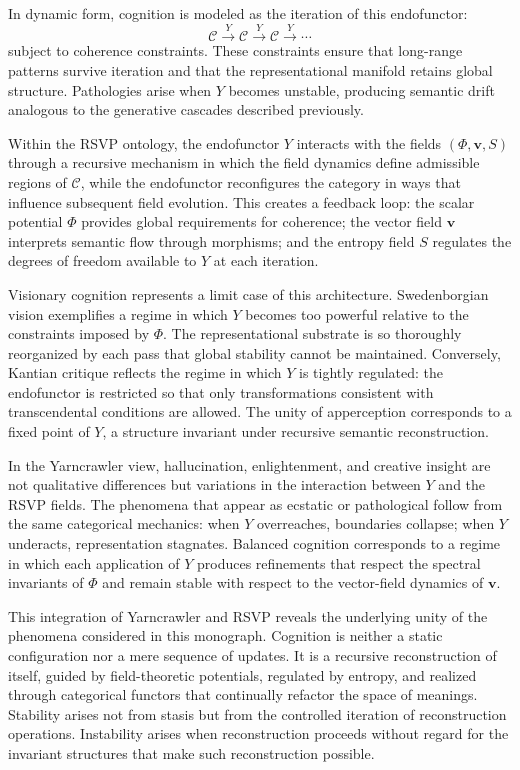 \documentclass[12pt]{article}
\begin{document}
In dynamic form, cognition is modeled as the iteration of this endofunctor:
\[
\mathcal{C} \xrightarrow{Y} \mathcal{C} \xrightarrow{Y} \mathcal{C} \xrightarrow{Y} \cdots
\]
subject to coherence constraints.  These constraints ensure that long-range 
patterns survive iteration and that the representational manifold retains 
global structure.  Pathologies arise when $Y$ becomes unstable, producing 
semantic drift analogous to the generative cascades described previously.

Within the RSVP ontology, the endofunctor $Y$ interacts with the fields 
$(\Phi, \mathbf{v}, S)$ through a recursive mechanism in which the field 
dynamics define admissible regions of $\mathcal{C}$, while the endofunctor 
reconfigures the category in ways that influence subsequent field evolution.  
This creates a feedback loop: the scalar potential $\Phi$ provides global 
requirements for coherence; the vector field $\mathbf{v}$ interprets semantic 
flow through morphisms; and the entropy field $S$ regulates the degrees of 
freedom available to $Y$ at each iteration.

Visionary cognition represents a limit case of this architecture.  
Swedenborgian vision exemplifies a regime in which $Y$ becomes too powerful 
relative to the constraints imposed by $\Phi$.  The representational substrate 
is so thoroughly reorganized by each pass that global stability cannot be 
maintained.  Conversely, Kantian critique reflects the regime in which $Y$ is 
tightly regulated: the endofunctor is restricted so that only transformations 
consistent with transcendental conditions are allowed.  
The unity of apperception corresponds to a fixed point of $Y$, a structure 
invariant under recursive semantic reconstruction.

In the Yarncrawler view, hallucination, enlightenment, and creative insight are 
not qualitative differences but variations in the interaction between $Y$ and 
the RSVP fields.  The phenomena that appear as ecstatic or pathological follow 
from the same categorical mechanics: when $Y$ overreaches, boundaries collapse; 
when $Y$ underacts, representation stagnates.  
Balanced cognition corresponds to a regime in which each application of $Y$ 
produces refinements that respect the spectral invariants of $\Phi$ and remain 
stable with respect to the vector-field dynamics of $\mathbf{v}$.

This integration of Yarncrawler and RSVP reveals the underlying unity of the 
phenomena considered in this monograph.  Cognition is neither a static 
configuration nor a mere sequence of updates.  It is a recursive reconstruction 
of itself, guided by field-theoretic potentials, regulated by entropy, and 
realized through categorical functors that continually refactor the space of 
meanings.  Stability arises not from stasis but from the controlled iteration 
of reconstruction operations.  Instability arises when reconstruction proceeds 
without regard for the invariant structures that make such reconstruction 
possible.
\end{document}
